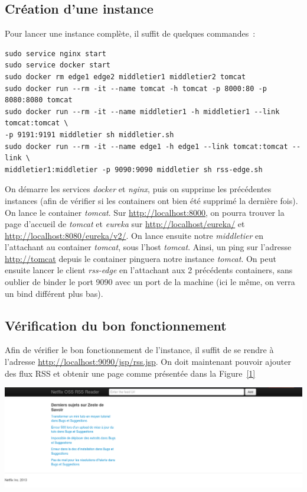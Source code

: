 \documentclass{article}
\begin{document}
	\subsection{Création d'une instance}
	Pour lancer une instance complète, il suffit de quelques commandes~:
	\begin{verbatim}
sudo service nginx start
sudo service docker start
sudo docker rm edge1 edge2 middletier1 middletier2 tomcat
sudo docker run --rm -it --name tomcat -h tomcat -p 8000:80 -p 8080:8080 tomcat
sudo docker run --rm -it --name middletier1 -h middletier1 --link tomcat:tomcat \
-p 9191:9191 middletier sh middletier.sh
sudo docker run --rm -it --name edge1 -h edge1 --link tomcat:tomcat --link \
middletier1:middletier -p 9090:9090 middletier sh rss-edge.sh
	\end{verbatim}
	On démarre les services \emph{docker} et \emph{nginx}, puis on supprime les précédentes instances (afin de vérifier si les containers ont bien été supprimé la dernière fois). On lance le container \emph{tomcat}. Sur \url{http://localhost:8000}, on pourra trouver la page d'accueil de \emph{tomcat} et \emph{eureka} sur \url{http://localhost/eureka/} et \url{http://localhost:8080/eureka/v2/}. On lance ensuite notre \emph{middletier} en l'attachant au container \emph{tomcat}, sous l'host \emph{tomcat}. Ainsi, un ping sur l'adresse \url{http://tomcat} depuis le container pinguera notre instance \emph{tomcat}. On peut ensuite lancer le client \emph{rss-edge} en l'attachant aux 2 précédents containers, sans oublier de binder le port 9090 avec un port de la machine (ici le même, on verra un bind différent plus bas).
	\subsection{Vérification du bon fonctionnement}
	Afin de vérifier le bon fonctionnement de l'instance, il suffit de se rendre à l'adresse \url{http://localhost:9090/jsp/rss.jsp}. On doit maintenant pouvoir ajouter des flux RSS et obtenir une page comme présentée dans la Figure~\ref{1}
	\begin{center}
		\includegraphics[scale=0.3]{rss9090}
		\label{1}
	\end{center}
\end{document}
